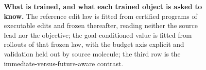 \begin{figure}[h]
\centering
{}
\caption{\small\textbf{What is trained, and what each trained object is asked to know.} The reference edit law is fitted from certified programs of executable edits and frozen thereafter, reading neither the source lead nor the objective; the goal-conditioned value is fitted from rollouts of that frozen law, with the budget axis explicit and validation held out by source molecule; the third row is the immediate-versus-future-aware contrast.}
\label{fig:trained}
\end{figure}
